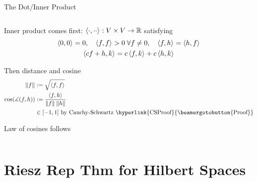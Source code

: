 \documentclass[10pt,compress,xcolor={usenames,dvipsnames},aspectratio=169]{beamer}
\begin{document}
\begin{frame}[label = dotproduct]{The Dot/Inner Product}
\begin{columns}
\begin{column}{0.5\textwidth}
{ \medskip
 
Inner product comes first:  $\left \langle \cdot, \cdot \cdot \right \rangle_{{}} :  V \times V \to \mathbb{R}$ satisfying
 \vspace{-1.5ex}
 \begin{gather*}
 \left \langle 0, 0 \right \rangle_{{}} =0, \quad \left \langle f, f \right \rangle_{{}} > 0 \; \forall f \ne 0, \quad
 \left \langle f, h \right \rangle_{{}} =\left \langle h, f \right \rangle_{{}} \\
  \left \langle cf+h, k \right \rangle_{{}} = c \left \langle f, k \right \rangle_{{}} + c\left \langle h, k \right \rangle_{{}} 
 \end{gather*}

\vspace{-1.5ex}
Then distance and cosine
\vspace{-1.5ex}
 \begin{align*}
 	\norm{f} & := \sqrt{\ip{f}{f}}
 	\\
 	\cos(\measuredangle(f,h)) & : = \frac{\ip{f}{h}}{\norm{f}\norm{h}}  \\
 	& \in [-1,1] \text{ by Cauchy-Schwartz \hyperlink{CSProof}{\beamergotobutton{Proof}}}
  \end{align*}
 
 \vspace{-1.5ex}
 Law of cosines follows 

}
\end{column}
\end{columns}

\end{frame}

\section{Riesz Rep Thm for Hilbert Spaces}
\end{document}
